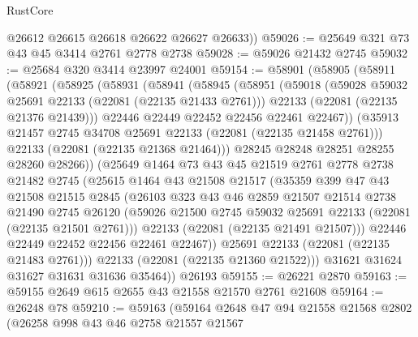 \begin{lexlean}{RustCore}
\begin{coremodule}
        @26612
        @26615
        @26618
        @26622
        @26627
        @26633))
@59026 := @25649 @321 @73 @43 @45 @3414 @2761 @2778 @2738
@59028 := @59026 @21432 @2745
@59032 := @25684 @320 @3414 @23997 @24001
@59154 := @58901
    (@58905
      (@58911
        (@58921
          (@58925
            (@58931
              (@58941
                (@58945
                  (@58951
                    (@59018
                      (@59028 @59032 @25691 @22133 (@22081 (@22135 @21433 @2761)))
                      @22133
                      (@22081 (@22135 @21376 @21439)))
                    @22446
                    @22449
                    @22452
                    @22456
                    @22461
                    @22467))
                (@35913 @21457 @2745 @34708 @25691 @22133 (@22081 (@22135 @21458 @2761)))
                @22133
                (@22081 (@22135 @21368 @21464)))
              @28245
              @28248
              @28251
              @28255
              @28260
              @28266))
          (@25649
            @1464
            @73
            @43
            @45
            @21519
            @2761
            @2778
            @2738
            @21482
            @2745
            (@25615
              @1464
              @43
              @21508
              @21517
              (@35359
                @399
                @47
                @43
                @21508
                @21515
                @2845
                (@26103
                  @323
                  @43
                  @46
                  @2859
                  @21507
                  @21514
                  @2738
                  @21490
                  @2745
                  @26120
                  (@59026 @21500 @2745 @59032 @25691 @22133 (@22081 (@22135 @21501 @2761)))
                  @22133
                  (@22081 (@22135 @21491 @21507)))
                @22446
                @22449
                @22452
                @22456
                @22461
                @22467))
            @25691
            @22133
            (@22081 (@22135 @21483 @2761)))
          @22133
          (@22081 (@22135 @21360 @21522)))
        @31621
        @31624
        @31627
        @31631
        @31636
        @35464))
    @26193
@59155 := @26221 @2870
@59163 := @59155 @2649 @615 @2655 @43 @21558 @21570 @2761 @21608
@59164 := @26248 @78
@59210 := @59163
    (@59164
      @2648
      @47
      @94
      @21558
      @21568
      @2802
      (@26258
        @998
        @43
        @46
        @2758
        @21557
        @21567

\end{coremodule}
\end{lexlean}
